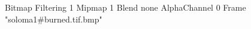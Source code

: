 {Bitmap
	{Filtering 1}
	{Mipmap 1}
	{Blend none}
	{AlphaChannel 0}
	{Frame "soloma1#burned.tif.bmp"}
}
